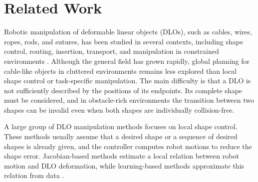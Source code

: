 \documentclass{pas}
\begin{document}




\section{Related Work}
\label{sec:related}

Robotic manipulation of deformable linear objects (DLOs), such as cables,
wires, ropes, rods, and sutures, has been studied in several contexts, including
shape control, routing, insertion, transport, and manipulation in constrained
environments \cite{Sanchez2018Survey,Yin2021Survey,Zhu2022ChallengesOutlook,
Caporali2026Survey}. Although the general field has grown rapidly, global
planning for cable-like objects in cluttered environments remains less explored
than local shape control or task-specific manipulation. The main difficulty is
that a DLO is not sufficiently described by the positions of its endpoints. Its
complete shape must be considered, and in obstacle-rich environments the
transition between two shapes can be invalid even when both shapes are
individually collision-free.


A large group of DLO manipulation methods focuses on local shape control.
These methods usually assume that a desired shape or a sequence of desired
shapes is already given, and the controller computes robot motions to reduce the
shape error. Jacobian-based methods estimate a local relation between robot
motion and DLO deformation, while learning-based methods approximate this
relation from data \cite{navarro2013model,
JinTomizuka2019CableManipulation,Lagneau2020ModelFreeWireServoing,
Lv2021CoordinatedFlexibleCables}.
\end{document}
